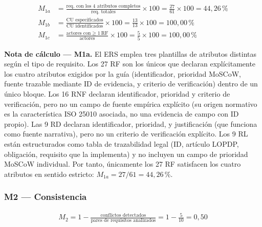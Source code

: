\documentclass[journal,onecolumn]{IEEEtran}
\begin{document}
{\setlength{\jot}{8pt}
	\begin{align*}
		M_{1a} &= \frac{\text{req. con los 4 atributos completos}}{\text{req. totales}} \times 100 = \frac{27}{61} \times 100 = 44{,}26\,\% \\
		M_{1b} &= \frac{\text{CU especificados}}{\text{CU identificados}} \times 100 = \frac{13}{13} \times 100 = 100{,}00\,\% \\
		M_{1c} &= \frac{\text{actores con} \geq 1\ \text{RF}}{\text{actores}} \times 100 = \frac{5}{5} \times 100 = 100{,}00\,\%
\end{align*}}

\textbf{Nota de cálculo --- M1a.} El ERS emplea tres plantillas de atributos distintas según el tipo de requisito. Los 27 RF son los únicos que declaran explícitamente los cuatro atributos exigidos por la guía (identificador, prioridad MoSCoW, fuente trazable mediante ID de evidencia, y criterio de verificación) dentro de un único bloque. Los 16 RNF declaran identificador, prioridad y criterio de verificación, pero no un campo de fuente empírica explícito (su origen normativo es la característica ISO 25010 asociada, no una evidencia de campo con ID propio). Las 9 RD declaran identificador, prioridad, y justificación (que funciona como fuente narrativa), pero no un criterio de verificación explícito. Los 9 RL están estructurados como tabla de trazabilidad legal (ID, artículo LOPDP, obligación, requisito que la implementa) y no incluyen un campo de prioridad MoSCoW individual. Por tanto, únicamente los 27 RF satisfacen los cuatro atributos en sentido estricto: $M_{1a} = 27/61 = 44{,}26\,\%$.

\subsubsection*{M2 --- Consistencia}

{\setlength{\jot}{8pt}
	\begin{align*}
		M_2 = 1 - \frac{\text{conflictos detectados}}{\text{pares de requisitos analizados}} = 1 - \frac{5}{10} = 0{,}50
\end{align*}}
\end{document}
